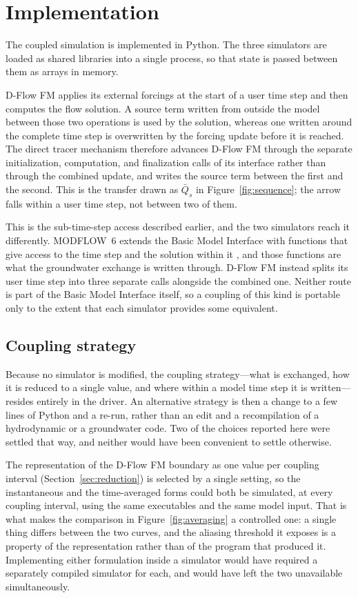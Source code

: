\documentclass[preprint,authoryear,11pt]{elsarticle}
\begin{document}
\section{Implementation}

The coupled simulation is implemented in Python. The three simulators are loaded as shared libraries into a single process, so that state is passed between them as arrays in memory.

D-Flow FM applies its external forcings at the start of a user time step and then computes the flow solution. A source term written from outside the model between those two operations is used by the solution, whereas one written around the complete time step is overwritten by the forcing update before it is reached. The direct tracer mechanism therefore advances D-Flow FM through the separate initialization, computation, and finalization calls of its interface rather than through the combined update, and writes the source term between the first and the second. This is the transfer drawn as $\bar{Q}_s$ in Figure~\ref{fig:sequence}; the arrow falls within a user time step, not between two of them.

This is the sub-time-step access described earlier, and the two simulators reach it differently. MODFLOW~6 extends the Basic Model Interface with functions that give access to the time step and the solution within it \citep{hughes2022modflowapi}, and those functions are what the groundwater exchange is written through. D-Flow FM instead splits its user time step into three separate calls alongside the combined one. Neither route is part of the Basic Model Interface itself, so a coupling of this kind is portable only to the extent that each simulator provides some equivalent.

\subsection{Coupling strategy}

Because no simulator is modified, the coupling strategy---what is exchanged, how it is reduced to a single value, and where within a model time step it is written---resides entirely in the driver. An alternative strategy is then a change to a few lines of Python and a re-run, rather than an edit and a recompilation of a hydrodynamic or a groundwater code. Two of the choices reported here were settled that way, and neither would have been convenient to settle otherwise.

The representation of the D-Flow FM boundary as one value per coupling interval (Section~\ref{sec:reduction}) is selected by a single setting, so the instantaneous and the time-averaged forms could both be simulated, at every coupling interval, using the same executables and the same model input. That is what makes the comparison in Figure~\ref{fig:averaging} a controlled one: a single thing differs between the two curves, and the aliasing threshold it exposes is a property of the representation rather than of the program that produced it. Implementing either formulation inside a simulator would have required a separately compiled simulator for each, and would have left the two unavailable simultaneously.
\end{document}
